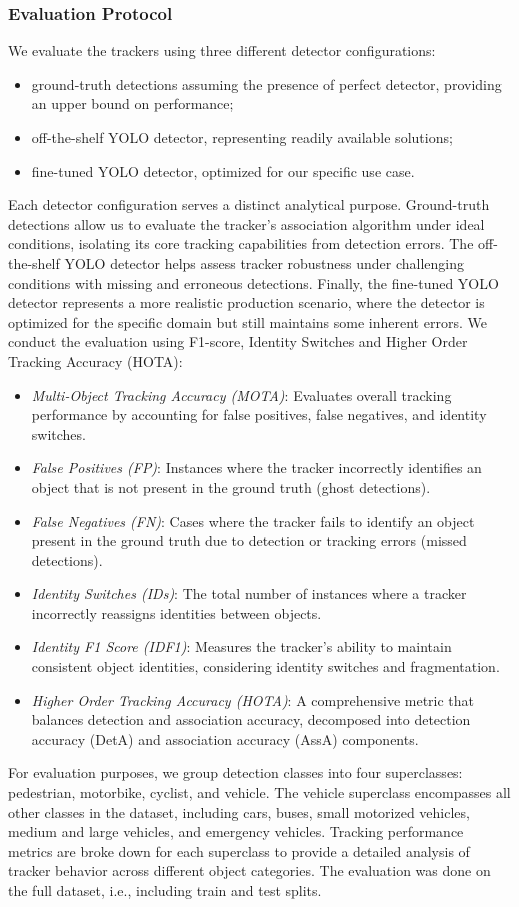 \subsubsection{Evaluation Protocol}
We evaluate the trackers using three different detector configurations:
\begin{itemize}
\item  ground-truth detections assuming the presence of perfect detector, providing an upper bound on performance;
\item  off-the-shelf YOLO detector, representing readily available solutions;
\item fine-tuned YOLO detector, optimized for our specific use case.
\end{itemize}
Each detector configuration serves a distinct analytical purpose. Ground-truth detections allow us to evaluate the tracker's association algorithm under ideal conditions, isolating its core tracking capabilities from detection errors. The off-the-shelf YOLO detector helps assess tracker robustness under challenging conditions with missing and erroneous detections. Finally, the fine-tuned YOLO detector represents a more realistic production scenario, where the detector is optimized for the specific domain but still maintains some inherent errors.
We conduct the evaluation using F1-score, Identity Switches and Higher Order Tracking Accuracy (HOTA):
\begin{itemize}
\item \textit{Multi-Object Tracking Accuracy (MOTA)}: Evaluates overall tracking performance by accounting for false positives, false negatives, and identity switches.
\item \textit{False Positives (FP)}: Instances where the tracker incorrectly identifies an object that is not present in the ground truth (ghost detections).
\item \textit{False Negatives (FN)}: Cases where the tracker fails to identify an object present in the ground truth due to detection or tracking errors (missed detections).
\item \textit{Identity Switches (IDs)}: The total number of instances where a tracker incorrectly reassigns identities between objects.
\item \textit{Identity F1 Score (IDF1)}: Measures the tracker's ability to maintain consistent object identities, considering identity switches and fragmentation.
\item \textit{Higher Order Tracking Accuracy (HOTA)}: A comprehensive metric that balances detection and association accuracy, decomposed into detection accuracy (DetA) and association accuracy (AssA) components.

\end{itemize}
For evaluation purposes, we group detection classes into four superclasses: pedestrian, motorbike, cyclist, and vehicle. The vehicle superclass encompasses all other classes in the dataset, including cars, buses, small motorized vehicles, medium and large vehicles, and emergency vehicles. Tracking performance metrics are broke down for each superclass to provide a detailed analysis of tracker behavior across different object categories. The evaluation was done on the full dataset, i.e., including train and test splits.


